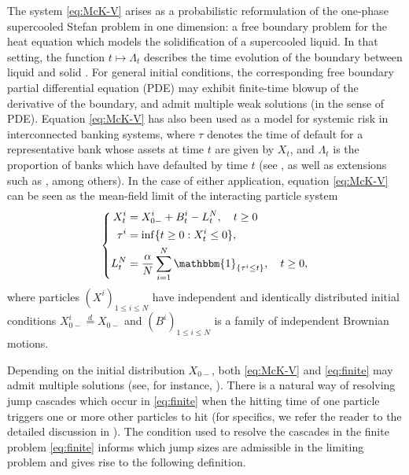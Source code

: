 \documentclass[12pt]{amsart}
\newcommand{\ind}{\mathbbm{1}}
\theoremstyle{plain}
\theoremstyle{definition}
\begin{document}
The system \eqref{eq:McK-V} arises as a probabilistic reformulation of the one-phase supercooled Stefan problem in one dimension: a free boundary problem for the heat equation which models the solidification of a supercooled liquid. In that setting, the function $t\mapsto\Lambda_t$ describes the time evolution of the boundary between liquid and solid \cite{delarue_global_2022}. For general initial conditions, the corresponding free boundary partial differential equation (PDE) may exhibit finite-time blowup of the derivative of the boundary, and admit multiple weak solutions (in the sense of PDE). Equation \eqref{eq:McK-V} has also been used as a model for systemic risk in interconnected banking systems, where $\tau$ denotes the time of default for a representative bank whose assets at time $t$ are given by $X_t$, and $\Lambda_t$ is the proportion of banks which have defaulted by time $t$ (see \cite{nadtochiy_particle_2019}, as well as extensions such as \cite{nadtochiy_mean_2019,hambly_spde_2019,baker_singular_2023}, among others).
In the case of either application, equation \eqref{eq:McK-V} can be seen as the mean-field limit of the interacting particle system
\begin{equation}\label{eq:finite}
\left\{
\begin{aligned}
    X_t^{i}&=X_{0-}^i+B_t^i-L_t^N,\quad t\ge 0\\
    \tau^i &= \inf \{t\ge 0: X_t^i\le 0\},\\
    L_t^N&=\frac{\alpha }{N}\sum_{i=1}^N \ind_{\{\tau^i\le t\}} ,\quad t\ge 0,
\end{aligned}
\right.
\end{equation}
where particles $(X^i)_{1\le i\le N}$ have independent and identically distributed initial conditions $X_{0-}^i\stackrel{d}{=}X_{0-}$ and $(B^i)_{1\le i\le N}$ is a family of independent Brownian motions. 

\medskip

Depending on the initial distribution $X_{0-}$, both \eqref{eq:McK-V} and \eqref{eq:finite} may admit multiple solutions (see, for instance, \cite[Subsections 2.1 and 3.1]{delarue_particle_2015}). There is a natural way of resolving jump cascades which occur in \eqref{eq:finite} when the hitting time of one particle triggers one or more other particles to hit (for specifics, we refer the reader to the detailed discussion in \cite[Section 3]{delarue_particle_2015}). The condition used to resolve the cascades in the finite problem \eqref{eq:finite} informs which jump sizes are admissible in the limiting problem and gives rise to the following definition.
\end{document}
